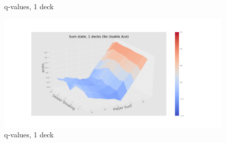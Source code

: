 \begin{center}
\begin{figure}[htp]
   \caption{q-values, 1 deck \label{sfig:3Dnd3}}
 \end{figure}
 \begin{figure}[htp]%
  	 \includegraphics[width=1.2\textwidth]{./figures/noace_3D_sum_1_decks.png}
   \caption{q-values, 1 deck \label{sfig:3Dnd3}}
 \end{figure}
\end{center}